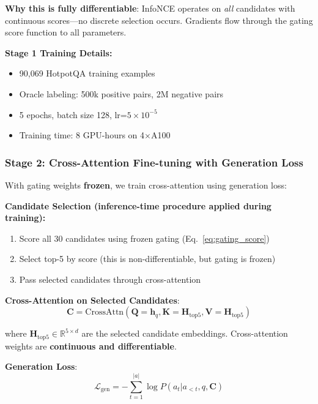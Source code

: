 \documentclass[10pt,twocolumn]{article}
\begin{document}
\textbf{Why this is fully differentiable}: InfoNCE operates on \textit{all} candidates with continuous scores—no discrete selection occurs. Gradients flow through the gating score function to all parameters.

\textbf{Stage 1 Training Details:}
\begin{itemize}
    \item 90,069 HotpotQA training examples
    \item Oracle labeling: 500k positive pairs, 2M negative pairs
    \item 5 epochs, batch size 128, lr=$5 \times 10^{-5}$
    \item Training time: 8 GPU-hours on 4×A100
\end{itemize}

\subsubsection{Stage 2: Cross-Attention Fine-tuning with Generation Loss}
\label{sec:stage2}

With gating weights \textbf{frozen}, we train cross-attention using generation loss:

\textbf{Candidate Selection (inference-time procedure applied during training):}
\begin{enumerate}
    \item Score all 30 candidates using frozen gating (Eq.~\ref{eq:gating_score})
    \item Select top-5 by score (this is non-differentiable, but gating is frozen)
    \item Pass selected candidates through cross-attention
\end{enumerate}

\textbf{Cross-Attention on Selected Candidates}:
\begin{equation}
\mathbf{C} = \text{CrossAttn}(\mathbf{Q}=\mathbf{h}_q, \mathbf{K}=\mathbf{H}_{\text{top5}}, \mathbf{V}=\mathbf{H}_{\text{top5}})
\end{equation}

where $\mathbf{H}_{\text{top5}} \in \mathbb{R}^{5 \times d}$ are the selected candidate embeddings. Cross-attention weights are \textbf{continuous and differentiable}.

\textbf{Generation Loss}:
\begin{equation}
\mathcal{L}_{\text{gen}} = -\sum_{t=1}^{|a|} \log P(a_t | a_{<t}, q, \mathbf{C})
\label{eq:gen_loss}
\end{equation}
\end{document}
